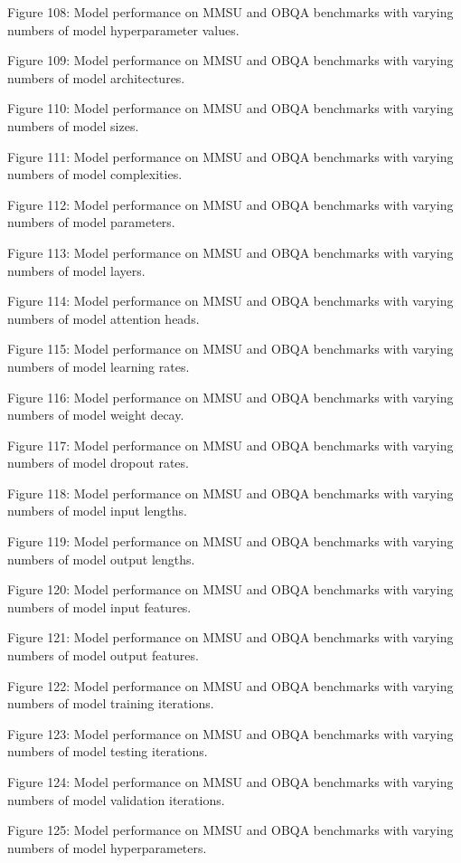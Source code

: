         Figure 108: Model performance on MMSU and OBQA benchmarks with varying numbers of model hyperparameter values.

        Figure 109: Model performance on MMSU and OBQA benchmarks with varying numbers of model architectures.

        Figure 110: Model performance on MMSU and OBQA benchmarks with varying numbers of model sizes.

        Figure 111: Model performance on MMSU and OBQA benchmarks with varying numbers of model complexities.

        Figure 112: Model performance on MMSU and OBQA benchmarks with varying numbers of model parameters.

        Figure 113: Model performance on MMSU and OBQA benchmarks with varying numbers of model layers.

        Figure 114: Model performance on MMSU and OBQA benchmarks with varying numbers of model attention heads.

        Figure 115: Model performance on MMSU and OBQA benchmarks with varying numbers of model learning rates.

        Figure 116: Model performance on MMSU and OBQA benchmarks with varying numbers of model weight decay.

        Figure 117: Model performance on MMSU and OBQA benchmarks with varying numbers of model dropout rates.

        Figure 118: Model performance on MMSU and OBQA benchmarks with varying numbers of model input lengths.

        Figure 119: Model performance on MMSU and OBQA benchmarks with varying numbers of model output lengths.

        Figure 120: Model performance on MMSU and OBQA benchmarks with varying numbers of model input features.

        Figure 121: Model performance on MMSU and OBQA benchmarks with varying numbers of model output features.

        Figure 122: Model performance on MMSU and OBQA benchmarks with varying numbers of model training iterations.

        Figure 123: Model performance on MMSU and OBQA benchmarks with varying numbers of model testing iterations.

        Figure 124: Model performance on MMSU and OBQA benchmarks with varying numbers of model validation iterations.

        Figure 125: Model performance on MMSU and OBQA benchmarks with varying numbers of model hyperparameters.

